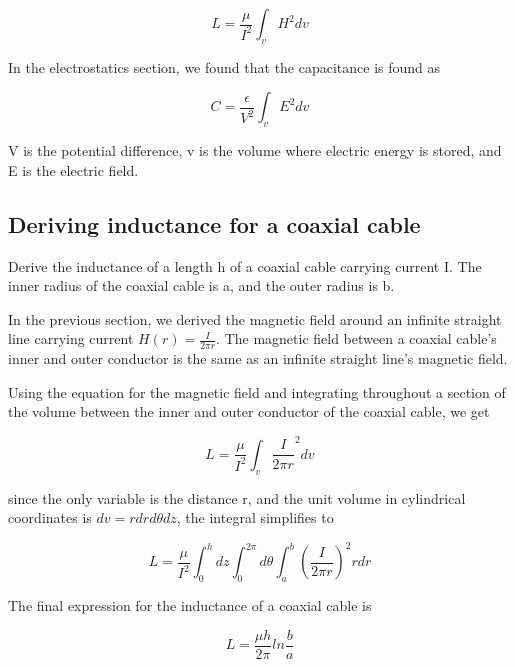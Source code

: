 \documentclass{ximera}
\begin{document}
\begin{equation}
L=\frac{\mu}{I^2} \int_v H^2 dv 
\end{equation}

In the electrostatics section, we found that the capacitance is found as


\begin{equation}
C=\frac{\epsilon}{V^2} \int_v E^2 dv 
\end{equation}

V is the potential difference, v is the volume where electric energy is stored, and E is the electric field.

\begin{example}
\section{Deriving inductance for a coaxial cable}

Derive the inductance of a length h of a coaxial cable carrying current I. The inner radius of the coaxial cable is a, and the outer radius is b. 

\begin{solution}
In the previous section, we derived the magnetic field around an infinite straight line carrying current $H(r)=\frac{I}{2 \pi r}$. The magnetic field between a coaxial cable's inner and outer conductor is the same as an infinite straight line's magnetic field.

Using the equation for the magnetic field and integrating throughout a section of the volume between the inner and outer conductor of the coaxial cable, we get


\begin{equation}
L=\frac{\mu}{I^2} \int_v \frac{I}{2 \pi r}^2 dv 
\end{equation}

since the only variable is the distance r, and the unit volume in cylindrical coordinates is $dv=r dr d\theta dz$, the integral simplifies to


\begin{equation}
L=\frac{\mu}{I^2} \int_0^h dz \int_0^{2 \pi} d\theta \int_a^b (\frac{I}{2 \pi r})^2 r dr
\end{equation}


The final expression for the inductance of a coaxial cable is 

\begin{equation}
L=\frac{\mu h}{2 \pi} ln\frac{b}{a}
\end{equation}

\end{solution}
\end{example}
\end{document}
